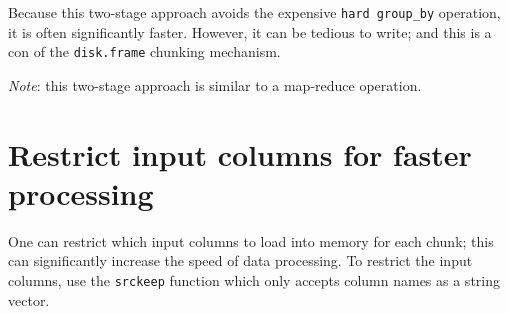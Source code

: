 \documentclass[]{book}
\newenvironment{Shaded}{\begin{snugshade}}{\end{snugshade}}
\newcommand{\CommentTok}[1]{\textcolor[rgb]{0.56,0.35,0.01}{\textit{#1}}}
\newcommand{\DataTypeTok}[1]{\textcolor[rgb]{0.13,0.29,0.53}{#1}}
\newcommand{\KeywordTok}[1]{\textcolor[rgb]{0.13,0.29,0.53}{\textbf{#1}}}
\newcommand{\NormalTok}[1]{#1}
\newcommand{\OperatorTok}[1]{\textcolor[rgb]{0.81,0.36,0.00}{\textbf{#1}}}
\newcommand{\StringTok}[1]{\textcolor[rgb]{0.31,0.60,0.02}{#1}}
\begin{document}
\begin{Shaded}
\end{Shaded}

Because this two-stage approach avoids the expensive \texttt{hard\ group\_by} operation, it is often significantly faster. However, it can be tedious to write; and this is a con of the \texttt{disk.frame} chunking mechanism.

\emph{Note}: this two-stage approach is similar to a map-reduce operation.

\hypertarget{restrict-input-columns-for-faster-processing}{%
\section{Restrict input columns for faster processing}\label{restrict-input-columns-for-faster-processing}}

One can restrict which input columns to load into memory for each chunk; this can significantly increase the speed of data processing. To restrict the input columns, use the \texttt{srckeep} function which only accepts column names as a string vector.
\end{document}

